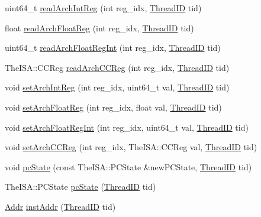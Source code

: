\begin{DoxyCompactItemize}
\item 
uint64\_\-t \hyperlink{classFullO3CPU_a804e1580f078efbacee5689c6a922743}{readArchIntReg} (int reg\_\-idx, \hyperlink{base_2types_8hh_ab39b1a4f9dad884694c7a74ed69e6a6b}{ThreadID} tid)
\item 
float \hyperlink{classFullO3CPU_adaf99a897128e25170e65323b1a5e342}{readArchFloatReg} (int reg\_\-idx, \hyperlink{base_2types_8hh_ab39b1a4f9dad884694c7a74ed69e6a6b}{ThreadID} tid)
\item 
uint64\_\-t \hyperlink{classFullO3CPU_a60141decbd780846e6669adf59970db1}{readArchFloatRegInt} (int reg\_\-idx, \hyperlink{base_2types_8hh_ab39b1a4f9dad884694c7a74ed69e6a6b}{ThreadID} tid)
\item 
TheISA::CCReg \hyperlink{classFullO3CPU_a58ef256fe449eed12535745bd734f4ef}{readArchCCReg} (int reg\_\-idx, \hyperlink{base_2types_8hh_ab39b1a4f9dad884694c7a74ed69e6a6b}{ThreadID} tid)
\item 
void \hyperlink{classFullO3CPU_a09df95cc1f92c9002cd7c0506e2ba864}{setArchIntReg} (int reg\_\-idx, uint64\_\-t val, \hyperlink{base_2types_8hh_ab39b1a4f9dad884694c7a74ed69e6a6b}{ThreadID} tid)
\item 
void \hyperlink{classFullO3CPU_ac527b87a643907df19ca5f4600200382}{setArchFloatReg} (int reg\_\-idx, float val, \hyperlink{base_2types_8hh_ab39b1a4f9dad884694c7a74ed69e6a6b}{ThreadID} tid)
\item 
void \hyperlink{classFullO3CPU_a1295e65a7841d7e83a5f3a3c44770c8f}{setArchFloatRegInt} (int reg\_\-idx, uint64\_\-t val, \hyperlink{base_2types_8hh_ab39b1a4f9dad884694c7a74ed69e6a6b}{ThreadID} tid)
\item 
void \hyperlink{classFullO3CPU_aae7106b0574d000f60ebacc2f938fe62}{setArchCCReg} (int reg\_\-idx, TheISA::CCReg val, \hyperlink{base_2types_8hh_ab39b1a4f9dad884694c7a74ed69e6a6b}{ThreadID} tid)
\item 
void \hyperlink{classFullO3CPU_a3b836956ac0c48ddf740167753bded14}{pcState} (const TheISA::PCState \&newPCState, \hyperlink{base_2types_8hh_ab39b1a4f9dad884694c7a74ed69e6a6b}{ThreadID} tid)
\item 
TheISA::PCState \hyperlink{classFullO3CPU_af486ac7476906f63fc6696b3e76a411b}{pcState} (\hyperlink{base_2types_8hh_ab39b1a4f9dad884694c7a74ed69e6a6b}{ThreadID} tid)
\item 
\hyperlink{base_2types_8hh_af1bb03d6a4ee096394a6749f0a169232}{Addr} \hyperlink{classFullO3CPU_afae6152cf4b3a51162d6e64247c1ac09}{instAddr} (\hyperlink{base_2types_8hh_ab39b1a4f9dad884694c7a74ed69e6a6b}{ThreadID} tid)
\item 

\end{DoxyCompactItemize}
